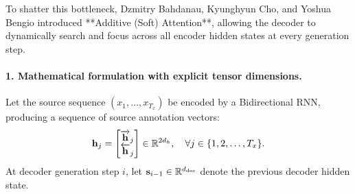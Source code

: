 \documentclass[../../main.tex]{subfiles}
\begin{document}
To shatter this bottleneck, Dzmitry Bahdanau, Kyunghyun Cho, and Yoshua Bengio \cite{bahdanau2014} introduced **Additive (Soft) Attention**, allowing the decoder to dynamically search and focus across all encoder hidden states at every generation step.

\paragraph{1. Mathematical formulation with explicit tensor dimensions.}
Let the source sequence $(x_1, \dots, x_{T_x})$ be encoded by a Bidirectional RNN, producing a sequence of source annotation vectors:
\begin{equation}
\mathbf{h}_j = \begin{bmatrix} \overrightarrow{\mathbf{h}}_j \\ \overleftarrow{\mathbf{h}}_j \end{bmatrix} \in \mathbb{R}^{2d_h}, \quad \forall j \in \{1, 2, \dots, T_x\}.
\end{equation}
At decoder generation step $i$, let $\mathbf{s}_{i-1} \in \mathbb{R}^{d_{\text{dec}}}$ denote the previous decoder hidden state.
\end{document}

